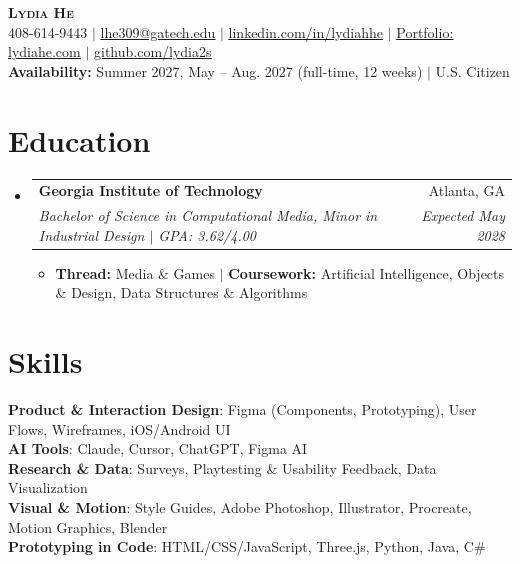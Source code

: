 \documentclass[letterpaper,11pt]{article}
\makeatletter
\newcommand{\resumeItem}[1]{
  \item\small{
    {#1 \vspace{-2pt}}
  }
}
\newcommand{\resumeSubheading}[4]{
  \vspace{-2pt}\item
    \begin{tabular*}{0.97\textwidth}[t]{l@{\extracolsep{\fill}}r}
      \textbf{#1} & #2 \\
      \textit{\small#3} & \textit{\small #4} \\
    \end{tabular*}\vspace{-7pt}
}
\newcommand{\resumeSubHeadingListStart}{\begin{itemize}[leftmargin=0.15in, label={}]}
\newcommand{\resumeSubHeadingListEnd}{\end{itemize}}
\newcommand{\resumeItemListStart}{\begin{itemize}}
\newcommand{\resumeItemListEnd}{\end{itemize}\vspace{-5pt}}
\makeatother
\begin{document}
\begin{center}
    \textbf{\Huge \scshape Lydia He} \\ \vspace{1pt}
    \small 408-614-9443 $|$ \href{mailto:lhe309@gatech.edu}{\underline{lhe309@gatech.edu}} $|$
    \href{https://www.linkedin.com/in/lydiahhe}{\underline{linkedin.com/in/lydiahhe}} $|$
    \href{https://lydiahe.com}{\underline{Portfolio: lydiahe.com}} $|$
    \href{https://github.com/lydia2s}{\underline{github.com/lydia2s}} \\ \vspace{2pt}
    \small \textbf{Availability:} Summer 2027, May -- Aug. 2027 (full-time, 12 weeks) $|$ U.S. Citizen %
\end{center}


\section{Education}
  \resumeSubHeadingListStart
    \resumeSubheading
      {Georgia Institute of Technology}{Atlanta, GA}
      {Bachelor of Science in Computational Media, Minor in Industrial Design $|$ GPA: 3.62/4.00}{Expected May 2028}
      \resumeItemListStart
        \resumeItem{\textbf{Thread:} Media \& Games $|$ \textbf{Coursework:} Artificial Intelligence, Objects \& Design, Data Structures \& Algorithms}
      \resumeItemListEnd
  \resumeSubHeadingListEnd


\section{Skills}
 \begin{itemize}[leftmargin=0.15in, label={}]
    \small{\item{
     \textbf{Product \& Interaction Design}{: Figma (Components, Prototyping), User Flows, Wireframes, iOS/Android UI} \\
     \textbf{AI Tools}{: Claude, Cursor, ChatGPT, Figma AI} \\
     \textbf{Research \& Data}{: Surveys, Playtesting \& Usability Feedback, Data Visualization} \\
     \textbf{Visual \& Motion}{: Style Guides, Adobe Photoshop, Illustrator, Procreate, Motion Graphics, Blender} \\
     \textbf{Prototyping in Code}{: HTML/CSS/JavaScript, Three.js, Python, Java, C\#}
    }}
 \end{itemize}
\end{document}
